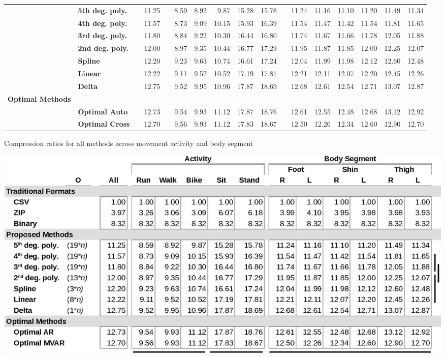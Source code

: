 \documentclass[journal]{IEEEtran}
\begin{document}
\begin{table}[htbp]
\begin{tabular}{lllrlrrrrrlrrrrrr}
 & \textbf{5th deg. poly.} &  & 11.25 &  & 8.59 & 8.92 & 9.87 & 15.28 & 15.78 &  & 11.24 & 11.16 & 11.10 & 11.20 & 11.49 & 11.34 \\ 
 & \textbf{4th deg. poly.} &  & 11.57 &  & 8.73 & 9.09 & 10.15 & 15.93 & 16.39 &  & 11.54 & 11.47 & 11.42 & 11.54 & 11.81 & 11.65 \\ 
 & \textbf{3rd deg. poly.} &  & 11.80 &  & 8.84 & 9.22 & 10.30 & 16.44 & 16.80 &  & 11.74 & 11.67 & 11.66 & 11.78 & 12.05 & 11.88 \\ 
 & \textbf{2nd deg. poly.} &  & 12.00 &  & 8.97 & 9.35 & 10.44 & 16.77 & 17.29 &  & 11.95 & 11.87 & 11.85 & 12.00 & 12.25 & 12.07 \\ 
 & \textbf{Spline} &  & 12.20 &  & 9.23 & 9.63 & 10.74 & 16.61 & 17.24 &  & 12.04 & 11.99 & 11.98 & 12.12 & 12.60 & 12.48 \\ 
 & \textbf{Linear} &  & 12.22 &  & 9.11 & 9.52 & 10.52 & 17.19 & 17.81 &  & 12.21 & 12.11 & 12.07 & 12.20 & 12.45 & 12.26 \\ 
 & \textbf{Delta} &  & 12.75 &  & 9.52 & 9.95 & 10.96 & 17.87 & 18.69 &  & 12.68 & 12.61 & 12.54 & 12.71 & 13.07 & 12.87 \\ 
\textbf{Optimal Methods} & \textbf{} &  & \multicolumn{1}{l}{} &  & \multicolumn{1}{l}{} & \multicolumn{1}{l}{} & \multicolumn{1}{l}{} & \multicolumn{1}{l}{} & \multicolumn{1}{l}{} &  & \multicolumn{1}{l}{} & \multicolumn{1}{l}{} & \multicolumn{1}{l}{} & \multicolumn{1}{l}{} & \multicolumn{1}{l}{} & \multicolumn{1}{l}{} \\ 
 & \textbf{Optimal Auto} &  & 12.73 &  & 9.54 & 9.93 & 11.12 & 17.87 & 18.76 &  & 12.61 & 12.55 & 12.48 & 12.68 & 13.12 & 12.92 \\ 
 & \textbf{Optimal Cross} &  & 12.70 &  & 9.56 & 9.93 & 11.12 & 17.83 & 18.67 &  & 12.50 & 12.26 & 12.34 & 12.60 & 12.90 & 12.70 \\ 
\end{tabular}
\label{table3}
\end{table}


\begin{table}[htbp]
\caption{Compression ratios for all methods across movement activity and body segment}
\includegraphics[width=\linewidth]{results_record.eps}
\label{table3}
\end{table}
\end{document}
